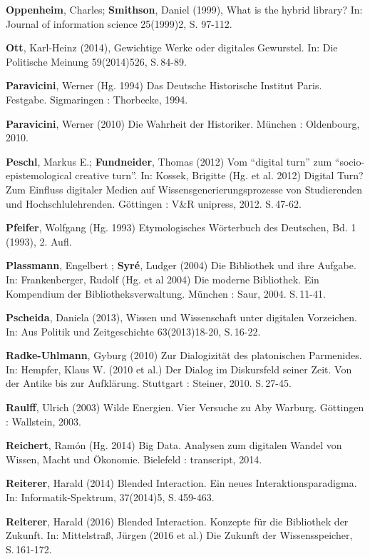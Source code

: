 \documentclass[a4paper,
fontsize=11pt,
oneside,
numbers=noperiodatend,
parskip=half-,
bibliography=totoc,
final
]{scrartcl}
\begin{document}
\textbf{Oppenheim}, Charles; \textbf{Smithson}, Daniel (1999), What is
the hybrid library? In: Journal of information science 25(1999)2, S.
97-112.

\textbf{Ott}, Karl-Heinz (2014), Gewichtige Werke oder digitales
Gewurstel. In: Die Politische Meinung 59(2014)526, S.\,84-89.

\textbf{Paravicini}, Werner (Hg. 1994) Das Deutsche Historische Institut
Paris. Festgabe. Sigmaringen : Thorbecke, 1994.

\textbf{Paravicini}, Werner (2010) Die Wahrheit der Historiker. München
: Oldenbourg, 2010.

\textbf{Peschl}, Markus E.; \textbf{Fundneider}, Thomas (2012) Vom
\enquote{digital turn} zum \enquote{socio-epistemological creative
turn}. In: Kossek, Brigitte (Hg. et al. 2012) Digital Turn? Zum Einfluss
digitaler Medien auf Wissensgenerierungsprozesse von Studierenden und
Hochschlulehrenden. Göttingen : V\&R unipress, 2012. S.\,47-62.

\textbf{Pfeifer}, Wolfgang (Hg. 1993) Etymologisches Wörterbuch des
Deutschen, Bd. 1 (1993), 2. Aufl.

\textbf{Plassmann}, Engelbert ; \textbf{Syré}, Ludger (2004) Die
Bibliothek und ihre Aufgabe. In: Frankenberger, Rudolf (Hg. et al 2004)
Die moderne Bibliothek. Ein Kompendium der Bibliotheksverwaltung.
München : Saur, 2004. S.\,11-41.

\textbf{Pscheida}, Daniela (2013), Wissen und Wissenschaft unter
digitalen Vorzeichen. In: Aus Politik und Zeitgeschichte 63(2013)18-20,
S.\,16-22.

\textbf{Radke-Uhlmann}, Gyburg (2010) Zur Dialogizität des platonischen
Parmenides. In: Hempfer, Klaus W. (2010 et al.) Der Dialog im
Diskursfeld seiner Zeit. Von der Antike bis zur Aufklärung. Stuttgart :
Steiner, 2010. S.\,27-45.

\textbf{Raulff}, Ulrich (2003) Wilde Energien. Vier Versuche zu Aby
Warburg. Göttingen : Wallstein, 2003.

\textbf{Reichert}, Ramón (Hg. 2014) Big Data. Analysen zum digitalen
Wandel von Wissen, Macht und Ökonomie. Bielefeld : transcript, 2014.

\textbf{Reiterer}, Harald (2014) Blended Interaction. Ein neues
Interaktionsparadigma. In: Informatik-Spektrum, 37(2014)5, S.\,459-463.

\textbf{Reiterer}, Harald (2016) Blended Interaction. Konzepte für die
Bibliothek der Zukunft. In: Mittelstraß, Jürgen (2016 et al.) Die
Zukunft der Wissensspeicher, S.\,161-172.
\end{document}
